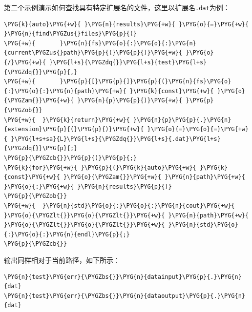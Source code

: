 
第二个示例演示如何查找具有特定扩展名的文件，这里以扩展名\texttt{.\allowbreak{}dat}为例：



\begin{codeblockbg}
\begin{Verbatim}[commandchars=\\\{\},breaklines=true,breakanywhere=true,fontsize=\codefont,xleftmargin=17bp]
\PYG{k}{auto}\PYG{+w}{ }\PYG{n}{results}\PYG{+w}{ }\PYG{o}{=}\PYG{+w}{ }\PYG{n}{find\PYGZus{}files}\PYG{p}{(}
\PYG{+w}{       }\PYG{n}{fs}\PYG{o}{:}\PYG{o}{:}\PYG{n}{current\PYGZus{}path}\PYG{p}{(}\PYG{p}{)}\PYG{+w}{ }\PYG{o}{/}\PYG{+w}{ }\PYG{l+s}{\PYGZdq{}}\PYG{l+s}{test}\PYG{l+s}{\PYGZdq{}}\PYG{p}{,}
\PYG{+w}{       }\PYG{p}{[}\PYG{p}{]}\PYG{p}{(}\PYG{n}{fs}\PYG{o}{:}\PYG{o}{:}\PYG{n}{path}\PYG{+w}{ }\PYG{k}{const}\PYG{+w}{ }\PYG{o}{\PYGZam{}}\PYG{+w}{ }\PYG{n}{p}\PYG{p}{)}\PYG{+w}{ }\PYG{p}{\PYGZob{}}
\PYG{+w}{  }\PYG{k}{return}\PYG{+w}{ }\PYG{n}{p}\PYG{p}{.}\PYG{n}{extension}\PYG{p}{(}\PYG{p}{)}\PYG{+w}{ }\PYG{o}{=}\PYG{o}{=}\PYG{+w}{ }\PYG{l+s+sa}{L}\PYG{l+s}{\PYGZdq{}}\PYG{l+s}{.dat}\PYG{l+s}{\PYGZdq{}}\PYG{p}{;}
\PYG{p}{\PYGZcb{}}\PYG{p}{)}\PYG{p}{;}
\PYG{k}{for}\PYG{+w}{ }\PYG{p}{(}\PYG{k}{auto}\PYG{+w}{ }\PYG{k}{const}\PYG{+w}{ }\PYG{o}{\PYGZam{}}\PYG{+w}{ }\PYG{n}{path}\PYG{+w}{ }\PYG{o}{:}\PYG{+w}{ }\PYG{n}{results}\PYG{p}{)}
\PYG{p}{\PYGZob{}}
\PYG{+w}{  }\PYG{n}{std}\PYG{o}{:}\PYG{o}{:}\PYG{n}{cout}\PYG{+w}{ }\PYG{o}{\PYGZlt{}}\PYG{o}{\PYGZlt{}}\PYG{+w}{ }\PYG{n}{path}\PYG{+w}{ }\PYG{o}{\PYGZlt{}}\PYG{o}{\PYGZlt{}}\PYG{+w}{ }\PYG{n}{std}\PYG{o}{:}\PYG{o}{:}\PYG{n}{endl}\PYG{p}{;}
\PYG{p}{\PYGZcb{}}
\end{Verbatim}
\end{codeblockbg}



输出同样相对于当前路径，如下所示：



\begin{codeblockbg}
\begin{Verbatim}[commandchars=\\\{\},breaklines=true,breakanywhere=true,fontsize=\codefont,xleftmargin=17bp]
\PYG{n}{test}\PYG{err}{\PYGZbs{}}\PYG{n}{datainput}\PYG{p}{.}\PYG{n}{dat}
\PYG{n}{test}\PYG{err}{\PYGZbs{}}\PYG{n}{dataoutput}\PYG{p}{.}\PYG{n}{dat}
\end{Verbatim}
\end{codeblockbg}


